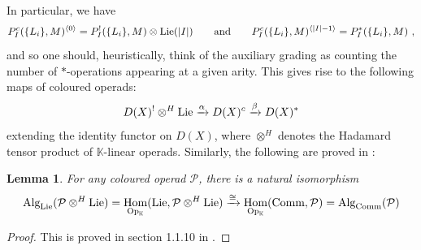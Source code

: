 \documentclass[11pt]{amsart}
\numberwithin{equation}{section}
\newtheorem{lemma}[theo]{Lemma}
\theoremstyle{definition}
\newcommand{\bb}{\mathbb}
\newcommand{\mc}{\mathcal}
\DeclareMathOperator{\Hom}{Hom}
\newcommand{\K}{{\bb K}}
\newcommand{\Alg}{{\textup{Alg}}}
\newcommand{\Comm}{{\textup{Comm}}}
\newcommand{\Lie}{{\textup{Lie}}}
\newcommand{\Op}{{\textup{Op}}}
\newcommand{\0}{{\textbf{0}}}
\newcommand{\DD}{{D}}
\def \Op{\mathrm{Op}}
\begin{document}
%
In particular, we have
\[ P_I^c(\{ L_i\},M)^{\langle 0\rangle} = P^!_I(\{L_i\},M)\otimes \Lie(|I|) \qquad \text{and}\qquad  P_I^c(\{ L_i\},M)^{\langle |I|-1 \rangle}= P^*_I(\{L_i\},M) \ , \]
and so one should, heuristically, think of the auxiliary grading as counting the number of $*$-operations appearing at a given arity. This gives rise to the following maps of coloured operads:
\begin{equation}\label{alphabetaeqn}
	\DD(X)^!\otimes^H \Lie \xrightarrow{\alpha} \DD(X)^c \xrightarrow{\beta} \DD(X)^*  
\end{equation}
extending the identity functor on $\DD(X)$, where $\otimes^H$ denotes the Hadamard tensor product of $\K$-linear operads. Similarly, the following are proved in \cite{BD1}:
\begin{lemma} For any coloured operad $\mc P$, there is a natural isomorphism
	\[ \Alg_{\Lie}(\mc P\otimes^H \Lie) = \Hom_{\Op_\K}( \Lie, \mc P\otimes^H \Lie) \xrightarrow{\cong}    \Hom_{\Op_\K}( \Comm, \mc P)=\Alg_{\Comm}(\mc P)\]
\end{lemma}
\begin{proof} This is proved in section 1.1.10 in \cite{BD1}.
\end{proof}
\end{document}
